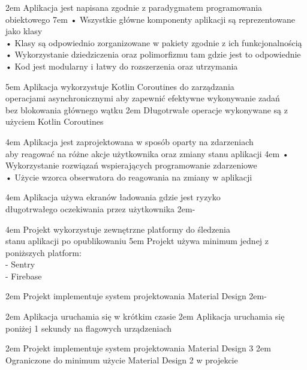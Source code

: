 {2em}{
    Aplikacja jest napisana zgodnie z paradygmatem programowania obiektowego
}
{7em}{
    • Wszystkie główne komponenty aplikacji są reprezentowane jako klasy\\
    • Klasy są odpowiednio zorganizowane w pakiety zgodnie z ich funkcjonalnością\\
    • Wykorzystanie dziedziczenia oraz polimorfizmu tam gdzie jest to odpowiednie\\
    • Kod jest modularny i łatwy do rozszerzenia oraz utrzymania
}

{5em}{
    Aplikacja wykorzystuje Kotlin Coroutines do zarządzania\\
    operacjami asynchronicznymi aby zapewnić efektywne wykonywanie zadań\\
    bez blokowania głównego wątku
}
{2em}{
    Długotrwałe operacje wykonywane są z użyciem Kotlin Coroutines
}

{4em}{
    Aplikacja jest zaprojektowana w sposób oparty na zdarzeniach\\
    aby reagować na różne akcje użytkownika oraz zmiany stanu aplikacji
}
{4em}{
    • Wykorzystanie rozwiązań wspierających programowanie zdarzeniowe\\
    • Użycie wzorca obserwatora do reagowania na zmiany w aplikacji
}

{4em}{
    Aplikacja używa ekranów ładowania gdzie jest ryzyko\\
    długotrwałego oczekiwania przez użytkownika
}
{2em}{-}

{4em}{
    Projekt wykorzystuje zewnętrzne platformy do śledzenia\\
    stanu aplikacji po opublikowaniu
}
{5em}{
    Projekt używa minimum jednej z poniższych platform:\\
    - Sentry\\
    - Firebase
}

{2em}{
    Projekt implementuje system projektowania Material Design
}
{2em}{-}

{2em}{
    Aplikacja uruchamia się w krótkim czasie
}
{2em}{
    Aplikacja uruchamia się poniżej 1 sekundy na flagowych urządzeniach
}

{2em}{
    Projekt implementuje system projektowania Material Design 3
}
{2em}{
    Ograniczone do minimum użycie Material Design 2 w projekcie
}

